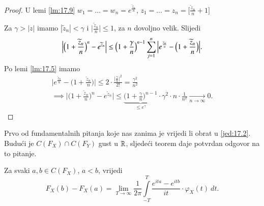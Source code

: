 \begin{proof}
    U lemi \ref{lm:17.9} $w_1 = \ldots = w_n = e^\frac{\widetilde{z}_n}{n}$, $z_1 = \ldots = z_n = \Big[ \frac{\widetilde{z}_n}{n} + 1 \Big]$

    Za $\gamma > |z|$ imamo $|\widetilde{z}_n| < \gamma$ i $\Big| \frac{\widetilde{z}_n}{n} \Big| \leq 1$, za $n$ dovoljno velik.
    Slijedi
    \begin{equation*}
        \Big| \Big( 1 + \frac{\widetilde{z}_n}{n} \Big)^n - e^{\widetilde{z}_n} \Big| \leq \Big(1 + \frac{\gamma}{n} \Big)^{n-1} \sum\limits_{j = 1}^{n} \Big| e^{\frac{\widetilde{z}_n}{n}} - \Big(1 + \frac{\widetilde{z}_n}{n}\Big) \Big|.
    \end{equation*}
    Po lemi \ref{lm:17.5} imamo
    \begin{equation*}
        \begin{gathered}
            \Big| e^{\frac{\widetilde{z}_n}{n}} - \Big( 1 + \frac{\widetilde{z}_n}{n} \Big) \Big| \leq 2 \cdot \frac{\Big| \frac{\gamma}{n}\Big|^2}{2!} = \frac{\gamma^2}{n^2}\\
            \implies \Big| \Big( 1 + \frac{\widetilde{z}_n}{n} \Big)^n - e^{\widetilde{z}_n} \Big| \leq \underbrace{\Big( 1 + \frac{\gamma}{n} \Big)^{n - 1}}_{\leq e^\gamma} \cdot \gamma^2 \cdot n \cdot \frac{1}{n^2} \xrightarrow[n \to \infty]{} 0.
        \end{gathered}
    \end{equation*}
\end{proof}

Prvo od fundamentalnih pitanja koje nas zanima je vrijedi li obrat u \eqref{jed:17.2}.
Budu\' ci je $C(F_X) \cap C(F_Y)$ gust u $\mathbb{R}$, sljede\' ci teorem daje potvrdan odgovor na to pitanje.

\begin{tm}  \label{tm:17.11}
    Za svaki $a, b \in C(F_X)$, $a < b$, vrijedi
    \begin{equation*}
        F_X (b) - F_X (a) = \lim\limits_{T \to \infty} \frac{1}{2 \pi} \int\limits_{-T}^T \frac{e^{ita} - e^{itb}}{it} \cdot \varphi_X (t) \: d t.
    \end{equation*}
\end{tm}

